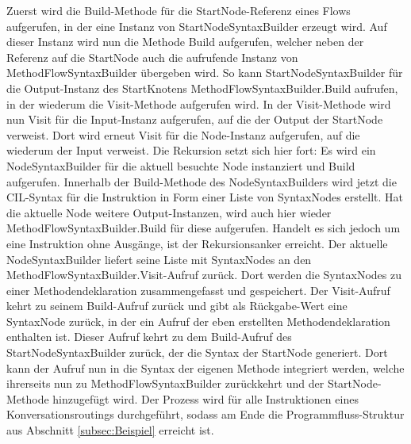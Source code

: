 Zuerst wird die Build-Methode für die StartNode-Referenz eines Flows aufgerufen, in der eine Instanz von StartNodeSyntaxBuilder erzeugt wird. Auf dieser Instanz wird nun die Methode Build aufgerufen, welcher neben der Referenz auf die StartNode auch die aufrufende Instanz von MethodFlowSyntaxBuilder übergeben wird. So kann StartNodeSyntaxBuilder für die Output-Instanz des StartKnotens MethodFlowSyntaxBuilder.Build aufrufen, in der wiederum die Visit-Methode aufgerufen wird. In der Visit-Methode wird nun Visit für die Input-Instanz aufgerufen, auf die der Output der StartNode verweist. Dort wird erneut Visit für die Node-Instanz aufgerufen, auf die wiederum der Input verweist. Die Rekursion setzt sich hier fort: Es wird ein NodeSyntaxBuilder für die aktuell besuchte Node instanziert und Build aufgerufen. Innerhalb der Build-Methode des NodeSyntaxBuilders wird jetzt die CIL-Syntax für die Instruktion in Form einer Liste von SyntaxNodes erstellt. Hat die aktuelle Node weitere Output-Instanzen, wird auch hier wieder MethodFlowSyntaxBuilder.Build für diese aufgerufen. Handelt es sich jedoch um eine Instruktion ohne Ausgänge, ist der Rekursionsanker erreicht. Der aktuelle NodeSyntaxBuilder liefert seine Liste mit SyntaxNodes an den MethodFlowSyntaxBuilder.Visit-Aufruf zurück. Dort werden die SyntaxNodes zu einer Methodendeklaration zusammengefasst und gespeichert. Der Visit-Aufruf kehrt zu seinem Build-Aufruf zurück und gibt als Rückgabe-Wert eine SyntaxNode zurück, in der ein Aufruf der eben erstellten Methodendeklaration enthalten ist. Dieser Aufruf kehrt zu dem Build-Aufruf des StartNodeSyntaxBuilder zurück, der die Syntax der StartNode generiert. Dort kann der Aufruf nun in die Syntax der eigenen Methode integriert werden, welche ihrerseits nun zu MethodFlowSyntaxBuilder zurückkehrt und der StartNode-Methode hinzugefügt wird. Der Prozess wird für alle Instruktionen eines Konversationsroutings durchgeführt, sodass am Ende die Programmfluss-Struktur aus Abschnitt \ref{subsec:Beispiel} erreicht ist.

